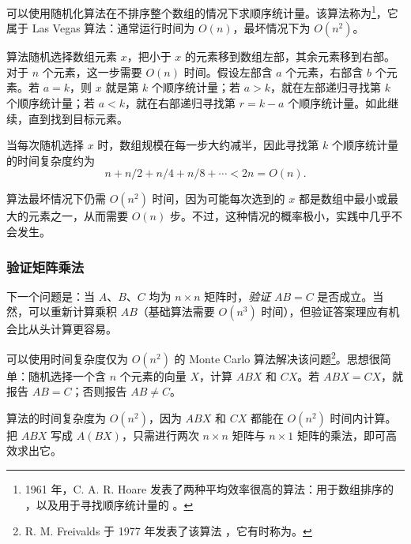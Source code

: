 可以使用随机化算法在不排序整个数组的情况下求顺序统计量。该算法称为\footnote{1961 年，C. A. R. Hoare 发表了两种平均效率很高的算法：用于数组排序的 \cite{hoa61a}，以及用于寻找顺序统计量的 \cite{hoa61b}。}，它属于 Las Vegas 算法：通常运行时间为 $O(n)$，最坏情况下为 $O(n^2)$。

算法随机选择数组元素 $x$，把小于 $x$ 的元素移到数组左部，其余元素移到右部。对于 $n$ 个元素，这一步需要 $O(n)$ 时间。假设左部含 $a$ 个元素，右部含 $b$ 个元素。若 $a=k$，则 $x$ 就是第 $k$ 个顺序统计量；若 $a>k$，就在左部递归寻找第 $k$ 个顺序统计量；若 $a<k$，就在右部递归寻找第 $r=k-a$ 个顺序统计量。如此继续，直到找到目标元素。

当每次随机选择 $x$ 时，数组规模在每一步大约减半，因此寻找第 $k$ 个顺序统计量的时间复杂度约为
\[n+n/2+n/4+n/8+\cdots < 2n = O(n).\]

算法最坏情况下仍需 $O(n^2)$ 时间，因为可能每次选到的 $x$ 都是数组中最小或最大的元素之一，从而需要 $O(n)$ 步。不过，这种情况的概率极小，实践中几乎不会发生。

\subsubsection{验证矩阵乘法}


下一个问题是：当 $A$、$B$、$C$ 均为 $n \times n$ 矩阵时，\emph{验证} $AB=C$ 是否成立。当然，可以重新计算乘积 $AB$（基础算法需要 $O(n^3)$ 时间），但验证答案理应有机会比从头计算更容易。

可以使用时间复杂度仅为 $O(n^2)$ 的 Monte Carlo 算法解决该问题\footnote{R. M. Freivalds 于 1977 年发表了该算法 \cite{fre77}，它有时称为。}。思想很简单：随机选择一个含 $n$ 个元素的向量 $X$，计算 $ABX$ 和 $CX$。若 $ABX=CX$，就报告 $AB=C$；否则报告 $AB\neq C$。

算法的时间复杂度为 $O(n^2)$，因为 $ABX$ 和 $CX$ 都能在 $O(n^2)$ 时间内计算。把 $ABX$ 写成 $A(BX)$，只需进行两次 $n\times n$ 矩阵与 $n\times1$ 矩阵的乘法，即可高效求出它。

